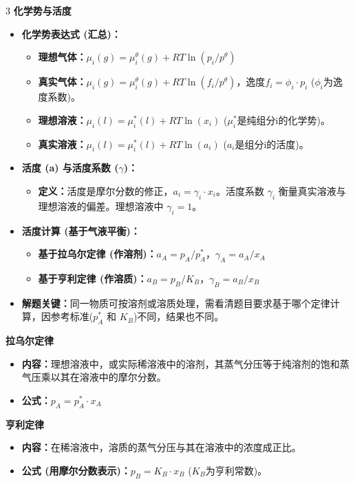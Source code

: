 \documentclass[a4paper,6pt]{article} %
\begin{document}
\begin{multicols}{3}
\textbf{化学势与活度}
\begin{itemize}
    \item \textbf{化学势表达式 (汇总)：}
    \begin{itemize}
        \item \textbf{理想气体：}$\mu_i(g) = \mu_i^\theta(g) + RT \ln(p_i/p^\theta)$
        \item \textbf{真实气体：}$\mu_i(g) = \mu_i^\theta(g) + RT \ln(f_i/p^\theta)$，逸度$f_i = \phi_i \cdot p_i$ ($\phi_i$为逸度系数)。
        \item \textbf{理想溶液：}$\mu_i(l) = \mu_i^*(l) + RT \ln(x_i)$ ($\mu_i^*$是纯组分i的化学势)。
        \item \textbf{真实溶液：}$\mu_i(l) = \mu_i^*(l) + RT \ln(a_i)$ ($a_i$是组分i的活度)。
    \end{itemize}
    \item \textbf{活度 (a) 与活度系数 ($\gamma$)：}
    \begin{itemize}
        \item \textbf{定义：}活度是摩尔分数的修正，$a_i = \gamma_i \cdot x_i$。活度系数 $\gamma_i$ 衡量真实溶液与理想溶液的偏差。理想溶液中 $\gamma_i = 1$。
    \end{itemize}
    \item \textbf{活度计算 (基于气液平衡)：}
    \begin{itemize}
        \item \textbf{基于拉乌尔定律 (作溶剂)：}$a_A = p_A / p_A^*$，$\gamma_A = a_A / x_A$
        \item \textbf{基于亨利定律 (作溶质)：}$a_B = p_B / K_B$，$\gamma_B = a_B / x_B$
    \end{itemize}
    \item \textbf{解题关键：}同一物质可按溶剂或溶质处理，需看清题目要求基于哪个定律计算，因参考标准($p_A^*$ 和 $K_B$)不同，结果也不同。
\end{itemize}

\textbf{拉乌尔定律}
\begin{itemize}
    \item \textbf{内容：}理想溶液中，或实际稀溶液中的溶剂，其蒸气分压等于纯溶剂的饱和蒸气压乘以其在溶液中的摩尔分数。
    \item \textbf{公式：}$p_A = p_A^* \cdot x_A$
\end{itemize}

\textbf{亨利定律}
\begin{itemize}
    \item \textbf{内容：}在稀溶液中，溶质的蒸气分压与其在溶液中的浓度成正比。
    \item \textbf{公式 (用摩尔分数表示)：}$p_B = K_B \cdot x_B$ ($K_B$为亨利常数)。
\end{itemize}


\end{multicols}
\end{document}
